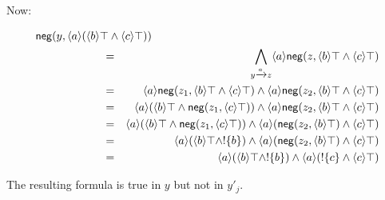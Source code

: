 \NI Now:

\begin{eqnarray*}
\lefteqn{\mathsf{neg}(y, \langle a \rangle (\langle b \rangle \top \AND \langle c \rangle \top))}\qquad \qquad \qquad  \\
& = & \bigwedge\limits_{y \xrightarrow{a} z} \langle a \rangle \mathsf{neg}(z, \langle b \rangle \top \AND \langle c \rangle \top)  \\
& = & \langle a \rangle \mathsf{neg}(z_1, \langle b \rangle \top \AND \langle c \rangle \top) \AND \langle a \rangle\mathsf{neg}(z_2, \langle b \rangle \top \AND \langle c \rangle \top)  \\
& = & \langle a \rangle (\langle b \rangle \top \AND \mathsf{neg}(z_1, \langle c \rangle \top)) \AND \langle a \rangle\mathsf{neg}(z_2, \langle b \rangle \top \AND \langle c \rangle \top)  \\
& = & \langle a \rangle (\langle b \rangle \top \AND \mathsf{neg}(z_1, \langle c \rangle \top)) \AND \langle a \rangle(\mathsf{neg}(z_2, \langle b \rangle \top) \AND \langle c \rangle \top)  \\
& = & \langle a \rangle (\langle b \rangle \top \AND \fBang \{b\}) \AND \langle a \rangle(\mathsf{neg}(z_2, \langle b \rangle \top) \AND \langle c \rangle \top)  \\
& = & \langle a \rangle (\langle b \rangle \top \AND \fBang \{b\}) \AND \langle a \rangle(\fBang \{c\} \AND \langle c \rangle \top) 
\end{eqnarray*}

\NI The resulting formula is true in $y$ but not in $y'_j$.


